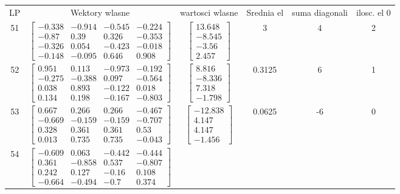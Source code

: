 \documentclass[a4paper,12pt]{article}
\begin{document}
\bgroup {} \vspace{0.2in} \begin{tabular}{c c c c c c}
LP &Wektory wlasne & wartosci wlasne & Srednia el & suma diagonali & ilosc. el 0\\
51
&
$\begin{bmatrix} -0.338 & -0.914 & -0.545 & -0.224 \\ -0.87 & 0.39 & 0.326 & -0.353 \\ -0.326 & 0.054 & -0.423 & -0.018 \\ -0.148 & -0.095 & 0.646 & 0.908 \end{bmatrix}$
&
$\begin{bmatrix} 13.648 \\ -8.545 \\ -3.56 \\ 2.457 \end{bmatrix}$
&
3
&
4
&
2
\\
52
&
$\begin{bmatrix} 0.951 & 0.113 & -0.973 & -0.192 \\ -0.275 & -0.388 & 0.097 & -0.564 \\ 0.038 & 0.893 & -0.122 & 0.018 \\ 0.134 & 0.198 & -0.167 & -0.803 \end{bmatrix}$
&
$\begin{bmatrix} 8.816 \\ -8.336 \\ 7.318 \\ -1.798 \end{bmatrix}$
&
0.3125
&
6
&
1
\\
53
&
$\begin{bmatrix} 0.667 & 0.266 & 0.266 & -0.467 \\ -0.669 & -0.159 & -0.159 & -0.707 \\ 0.328 & 0.361 & 0.361 & 0.53 \\ 0.013 & 0.735 & 0.735 & -0.043 \end{bmatrix}$
&
$\begin{bmatrix} -12.838 \\ 4.147 \\ 4.147 \\ -1.456 \end{bmatrix}$
&
0.0625
&
-6
&
0
\\
54
&
$\begin{bmatrix} -0.609 & 0.063 & -0.442 & -0.444 \\ 0.361 & -0.858 & 0.537 & -0.807 \\ 0.242 & 0.127 & -0.16 & 0.108 \\ -0.664 & -0.494 & -0.7 & 0.374 \end{bmatrix}$

\end{tabular}
\end{document}
